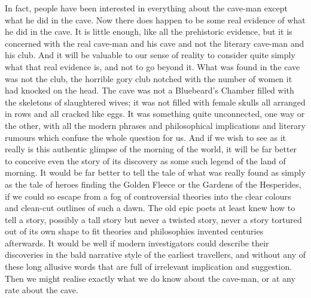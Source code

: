 In fact, people have been interested in everything about the cave-man except what he did in the cave. Now there does happen to be some real evidence of what he did in the cave. It is little enough, like all the prehistoric evidence, but it is concerned with the real cave-man and his cave and not the literary cave-man and his club. And it will be valuable to our sense of reality to consider quite simply what that real evidence is, and not to go beyond it. What was found in the cave was not the club, the horrible gory club notched with the number of women it had knocked on the head. The cave was not a Bluebeard's Chamber filled with the skeletons of slaughtered wives; it was not filled with female skulls all arranged in rows and all cracked like eggs. It was something quite unconnected, one way or the other, with all the modern phrases and philosophical implications and literary rumours which confuse the whole question for us. And if we wish to see as it really is this authentic glimpse of the morning of the world, it will be far better to conceive even the story of its discovery as some such legend of the land of morning. It would be far better to tell the tale of what was really found as simply as the tale of heroes finding the Golden Fleece or the Gardens of the Hesperides, if we could so escape from a fog of controversial theories into the clear colours and clean-cut outlines of such a dawn. The old epic poets at least knew how to tell a story, possibly a tall story but never a twisted story, never a story tortured out of its own shape to fit theories and philosophies invented centuries afterwards. It would be well if modern investigators could describe their discoveries in the bald narrative style of the earliest travellers, and without any of these long allusive words that are full of irrelevant implication and suggestion. Then we might realise exactly what we do know about the cave-man, or at any rate about the cave.

